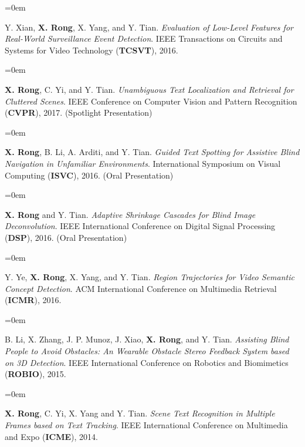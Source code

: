 \documentclass{scrartcl}
\newcommand{\Description}[1]{\hangindent=0em\hangafter=0\noindent\raggedright\footnotesize{#1}\par\normalsize\vspace{1em}} %
\begin{document}
\begin{cv}{}
\vspace{0.5em} %


\noindent{}\vspace{0.5em}

\Description{Y. Xian, \textbf{X. Rong}, X. Yang, and Y. Tian. \textit{Evaluation of Low-Level Features for Real-World Surveillance Event Detection}. IEEE Transactions on Circuits and Systems for Video Technology (\textbf{TCSVT}), 2016.}

\vspace{0.5em} %

\noindent{}\vspace{0.5em}

\Description{\textbf{X. Rong}, C. Yi, and Y. Tian. \textit{Unambiguous Text Localization and Retrieval for Cluttered Scenes}. IEEE Conference on Computer Vision and Pattern Recognition (\textbf{CVPR}), 2017. (Spotlight Presentation)}

\Description{\textbf{X. Rong}, B. Li, A. Arditi, and Y. Tian. \textit{Guided Text Spotting for Assistive Blind Navigation in Unfamiliar Environments}. International Symposium on Visual Computing (\textbf{ISVC}), 2016. (Oral Presentation)}

\Description{\textbf{X. Rong} and Y. Tian. \textit{Adaptive Shrinkage Cascades for Blind Image Deconvolution}. IEEE International Conference on Digital Signal Processing (\textbf{DSP}), 2016. (Oral Presentation)}

\Description{Y. Ye, \textbf{X. Rong}, X. Yang, and Y. Tian. \textit{Region Trajectories for Video Semantic Concept Detection}. ACM International Conference on Multimedia Retrieval (\textbf{ICMR}), 2016.}

\Description{B. Li, X. Zhang, J. P. Munoz, J. Xiao, \textbf{X. Rong}, and Y. Tian. \textit{Assisting Blind People to Avoid Obstacles: An Wearable Obstacle Stereo Feedback System based on 3D Detection}. IEEE International Conference on Robotics and Biomimetics (\textbf{ROBIO}), 2015.}

\Description{\textbf{X. Rong}, C. Yi, X. Yang and Y. Tian. \textit{Scene Text Recognition in Multiple Frames based on Text Tracking}. IEEE International Conference on Multimedia and Expo (\textbf{ICME}), 2014.}


\end{cv}
\end{document}

